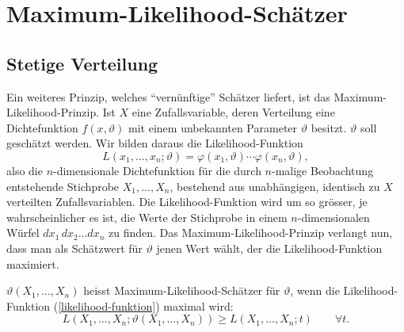 \section{Maximum-Likelihood-Schätzer}
\label{section-maximum-likelihood-schaetzer}

\subsection{Stetige Verteilung}
Ein weiteres Prinzip, welches ``vernünftige'' Schätzer liefert,
ist das Maximum-Likelihood-Prinzip.
Ist $X$ eine Zufallsvariable, deren
Verteilung eine Dichtefunktion $f(x,\vartheta)$ mit einem unbekannten
Parameter $\vartheta$ besitzt. $\vartheta$ soll geschätzt werden.
Wir bilden daraus die Likelihood-Funktion
%
\begin{equation}
L(x_1,\dots,x_n;\vartheta)=\varphi(x_1,\vartheta)\cdots \varphi(x_n,\vartheta),
\label{likelihood-funktion}
\end{equation}
also die $n$-dimensionale Dichtefunktion für die durch $n$-malige 
Beobachtung entstehende Stichprobe $X_1,\dots,X_n$, bestehend aus
unabhängigen, identisch zu $X$ verteilten Zufallsvariablen.
Die Likelihood-Funktion wird um so grösser, je wahrscheinlicher
es ist, die Werte der Stichprobe in einem $n$-dimensionalen Würfel
$dx_1\,dx_2\dots dx_n$ zu finden.
Das Maximum-Likelihood-Prinzip
verlangt nun, dass man als Schätzwert für $\vartheta$ jenen Wert
wählt, der die Likelihood-Funktion maximiert.

\begin{definition}
$\vartheta(X_1,\dots,X_n)$ heisst Maximum-Likelihood-Schätzer für
$\vartheta$, wenn die Likelihood-Funktion (\ref{likelihood-funktion})
maximal wird:
\begin{equation}
L(X_1,\dots,X_n;\vartheta(X_1,\dots,X_n)) \ge L(X_1,\dots,X_n;t)\qquad\forall t.
\end{equation}
\end{definition}

